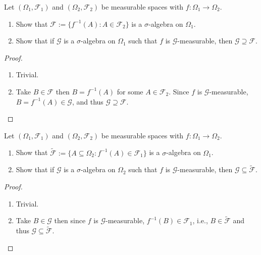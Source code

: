 \documentclass[11pt,singlecolumn, openany, citestyle=authoryear]{elegantbook}
\begin{document}
\begin{CJK}{UTF8}{gbsn}
\begin{exercise}
    Let $(\Omega_1,\mathcal{F}_1)$ and $(\Omega_2,\mathcal{F}_2)$ be measurable spaces with $f:\Omega_1\to \Omega_2$.
    \begin{enumerate}
        \item Show that $\mathcal{F}:=\{f^{-1}(A):A\in \mathcal{F}_2\}$ is a $\sigma$-algebra on 
        $\Omega_1$.
        \item Show that if $\mathcal{G}$ is a $\sigma$-algebra on $\Omega_1$ such that $f$ is 
        $\mathcal{G}$-measurable,
        then $\mathcal{G} \supseteq \mathcal{F}$.
    \end{enumerate}
\end{exercise}
\begin{proof}
    \begin{enumerate}
        \item Trivial.
        \item Take $B \in \mathcal{F}$ then $B=f^{-1}(A)$ for some $A\in\mathcal{F}_2$.
        Since $f$ is $\mathcal{G}$-measurable, 
        $B=f^{-1}(A)\in \mathcal{G}$, and thus $\mathcal{G} \supseteq \mathcal{F}$.
    \end{enumerate}
\end{proof}

\begin{exercise}
    Let $(\Omega_1,\mathcal{F}_1)$ and $(\Omega_2,\mathcal{F}_2)$ be measurable spaces
    with $f:\Omega_1\to \Omega_2$.
    \begin{enumerate}
        \item Show that $\tilde{\mathcal{F}}:=\{A\subseteq \Omega_2: f^{-1}(A)\in \mathcal{F}_1\}$
        is a $\sigma$-algebra on $\Omega_1$.
        \item Show that if $\mathcal{G}$ is a $\sigma$-algebra on $\Omega_2$ such that $f$ is 
        $\mathcal{G}$-measurable,
        then $\mathcal{G} \subseteq \tilde{\mathcal{F}}$.
    \end{enumerate}
\end{exercise}
\begin{proof}
    \begin{enumerate}
        \item Trivial.
        \item Take $B \in \mathcal{G}$ then since $f$ is $\mathcal{G}$-measurable,
        $f^{-1}(B)\in \mathcal{F}_1$, i.e., $B \in \tilde{\mathcal{F}}$ and thus 
        $\mathcal{G} \subseteq \tilde{\mathcal{F}}$.
    \end{enumerate}
\end{proof}


\end{CJK}
\end{document}
